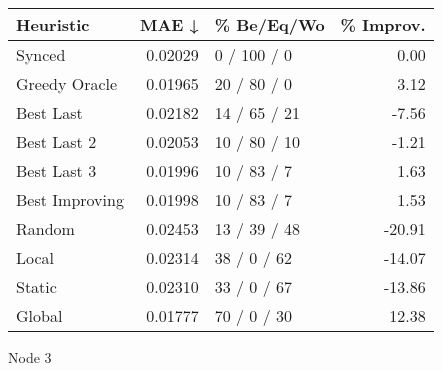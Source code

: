 \begin{tabular}{lrlr}
\toprule
\textbf{Heuristic} & \textbf{MAE ↓} & \textbf{\% Be/Eq/Wo} & \textbf{\% Improv.} \\
\midrule
            Synced &        0.02029 &          0 / 100 / 0 &                0.00 \\
     Greedy Oracle &        0.01965 &          20 / 80 / 0 &                3.12 \\
         Best Last &        0.02182 &         14 / 65 / 21 &               -7.56 \\
       Best Last 2 &        0.02053 &         10 / 80 / 10 &               -1.21 \\
       Best Last 3 &        0.01996 &          10 / 83 / 7 &                1.63 \\
    Best Improving &        0.01998 &          10 / 83 / 7 &                1.53 \\
            Random &        0.02453 &         13 / 39 / 48 &              -20.91 \\
             Local &        0.02314 &          38 / 0 / 62 &              -14.07 \\
            Static &        0.02310 &          33 / 0 / 67 &              -13.86 \\
            Global &        0.01777 &          70 / 0 / 30 &               12.38 \\
\bottomrule
\end{tabular}
\caption{Node 3}
\label{tab:non_lr05_le1_bs2_3}
